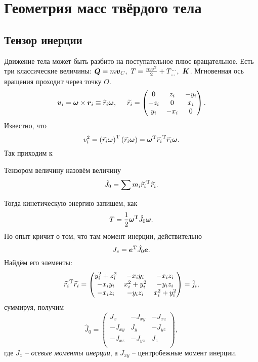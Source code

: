\section{Геометрия масс твёрдого тела}

\subsection{Тензор инерции}

Движение тела может быть разбито на поступательное плюс вращательное. 
Есть три классические величины: $\mbox{\boldmath $Q$} = m \mbox{\boldmath $v$}_C, \ T=\frac{mv^2}{2} + T_{...}^{...}, \ \mbox{\boldmath $K$}$. Мгновенная ось вращения проходит через точку $O$. 
$$
    \mbox{\boldmath $v$}_i = \mbox{\boldmath $\omega$} \times \mbox{\boldmath $r$}_i \equiv \widetilde r_i \mbox{\boldmath $\omega$},
    \hspace{0.5cm} \widetilde{r_i} = \begin{pmatrix}
        0 &z_i &- y_i \\
        -z_i & 0 & x_i \\
        y_i & -x_i & 0\\
    \end{pmatrix}.
$$
Известно, что
$$
    v_i^2 = \left(
        \widetilde{r_i} \mbox{\boldmath $\omega$}
    \right)^{\text{T}} \left(
        \widetilde{r_i} \mbox{\boldmath $\omega$}
    \right) = \mbox{\boldmath $\omega$}^{\text{T}} \widetilde{r_i}^{\text{T}} \widetilde{r_i} \mbox{\boldmath $\omega$}.
$$
Так приходим к
\begin{to_def} 
Тензором величину назовём величину 
\begin{equation}
    \hat J_0 = \sum m_i \widetilde{r_i}^{\text{T}} \widetilde{r_i}.
\end{equation}
\end{to_def}
Тогда кинетическую энергию запишем, как
\begin{equation}
    T = \frac{1}{2} \mbox{\boldmath $\omega$}^{\text{T}} 
        \hat J_0 \mbox{\boldmath $\omega$}.
\end{equation}
Но опыт кричит о том, что там момент инерции, действительно
\begin{equation}
    J_e = \mbox{\boldmath $e$}^{\text{T}} \hat J_0 \mbox{\boldmath $e$}.
\end{equation}
Найдём его элементы:
\begin{equation}
    \widetilde{r_i}^{\text{T}} \widetilde{r_i} = \begin{pmatrix}
        y_i^2 + z_i^2 & -x_i y_i & - x_i z_i \\
        -x_i y_i & x_i^2 + y_i^2 & - y_i z_i \\
        -x_i z_i & -y_i z_i & x_i^2 + y_i^2 \\
    \end{pmatrix} = \hat j_i,
\end{equation}
суммируя, получим
\begin{equation}
    \hat J_0 = \begin{pmatrix}
        J_x & - J_{xy} & -J_{xz} \\
        -J_{xy} & J_y & -J_{yz} \\
        -J_{xz} & -J_{yz} & J_z \\
    \end{pmatrix},
\end{equation}
где $J_x$ -- \textit{осевые моменты инерции}, а $J_{xy}$ -- центробежные момент инерции. 

